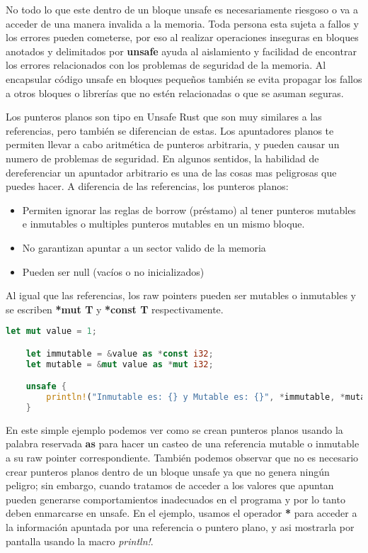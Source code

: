 No todo lo que este dentro de un bloque unsafe es necesariamente riesgoso o va a acceder de una manera invalida a la memoria. Toda persona esta sujeta a fallos y los errores pueden cometerse, por eso al realizar operaciones inseguras en bloques anotados y delimitados por \textbf{unsafe} ayuda al aislamiento y facilidad de encontrar los errores relacionados con los problemas de seguridad de la memoria. Al encapsular código unsafe en bloques pequeños también se evita propagar los fallos a otros bloques o librerías que no estén relacionadas o que se asuman seguras.

Los punteros planos son tipo en Unsafe Rust que son muy similares a las referencias, pero también se diferencian de estas. Los apuntadores planos te permiten llevar a cabo aritmética de punteros arbitraria, y pueden causar un numero de problemas de seguridad. En algunos sentidos, la habilidad de dereferenciar un apuntador arbitrario es una de las cosas mas peligrosas que puedes hacer.
A diferencia de las referencias, los punteros planos:
\begin{itemize}
    \item Permiten ignorar las reglas de borrow (préstamo) al tener punteros mutables e inmutables o multiples punteros mutables en un mismo bloque.
    \item No garantizan apuntar a un sector valido de la memoria
    \item Pueden ser null (vacíos o no inicializados)
\end{itemize}

Al igual que las referencias, los raw pointers pueden ser mutables o inmutables y se escriben \textbf{*mut T} y \textbf{*const T} respectivamente.
\begin{lstlisting}[language=Rust]
    let mut value = 1;

    let immutable = &value as *const i32;
    let mutable = &mut value as *mut i32;

    unsafe {
        println!("Inmutable es: {} y Mutable es: {}", *immutable, *mutable);
    }
\end{lstlisting}

En este simple ejemplo podemos ver como se crean punteros planos usando la palabra reservada \textbf{as} para hacer un casteo de una referencia mutable o inmutable a su raw pointer correspondiente. También podemos observar que no es necesario crear punteros planos dentro de un bloque unsafe ya que no genera ningún peligro; sin embargo, cuando tratamos de acceder a los valores que apuntan pueden generarse comportamientos inadecuados en el programa y por lo tanto deben enmarcarse en unsafe. En el ejemplo, usamos el operador \textbf{*} para acceder a la información apuntada por una referencia o puntero plano, y asi mostrarla por pantalla usando la macro \textit{println!}.

